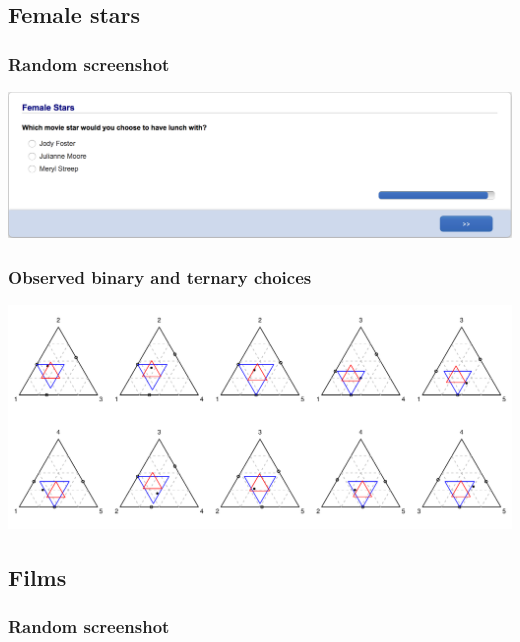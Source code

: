 \documentclass[11pt,letter]{article}
\begin{document}
\pagebreak

\subsection*{Female stars}



\subsubsection*{Random screenshot}

\includegraphics[width=15cm]{Population_study_design/screenshot_Female_Stars.png}

\subsubsection*{Observed binary and ternary choices}

\includegraphics[width=15cm]{./Population_study_data/Simplexes/Female_stars.pdf}

\pagebreak

\subsection*{Films}



\subsubsection*{Random screenshot}
\end{document}
